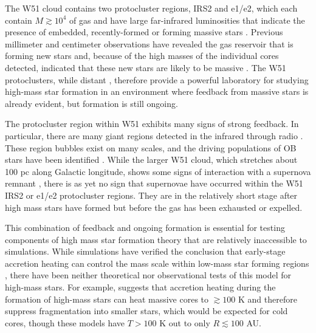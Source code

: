 \documentclass{emulateapj}
\begin{document}
The W51 cloud contains two protocluster regions, IRS2 and e1/e2, which each
contain $M\gtrsim10^4$ \msun of gas and have large far-infrared luminosities
that
indicate the presence of embedded, recently-formed or forming massive stars
\citep{Harvey1986a,Sievers1991a,Ginsburg2012a,Ginsburg2016b}.  Previous
millimeter and centimeter observations have revealed the gas reservoir
that is forming new stars and, because of the high masses of the individual
cores detected, indicated that these new stars are likely to be massive
\citep{Zhang1997a,Eisner2002a,Zapata2009a,Tang2009a,
Zapata2010a,Shi2010b,Shi2010a,Koch2010a,Koch2012a,Koch2012b,Tang2013b,Goddi2016a}.  The
W51 protoclusters, while distant \citep[5.4 kpc;][]{Sato2010a}, therefore
provide a powerful laboratory for studying high-mass star formation in an
environment where feedback from massive stars is already evident, but 
formation is still ongoing.

The protocluster region within W51 exhibits many signs of strong feedback.  In
particular, there are many giant \hii regions detected in the infrared through
radio \citep{Mehringer1994a,Ginsburg2015a}.  These \hii region bubbles exist
on many scales, and the driving populations of OB stars have been identified
\citep{Kumar2004a,Ginsburg2016a}.  While the larger W51 cloud, which stretches
about 100 pc along Galactic longitude, shows some signs of interaction with a
supernova remnant \citep{Brogan2013a,Ginsburg2015a}, there is as yet no
sign that supernovae have occurred within the W51 IRS2 or e1/e2 protocluster
regions.  They are in the relatively short stage after  high mass stars
have formed but before the gas has been exhausted or expelled.

This combination of feedback and ongoing formation is essential for testing
components of high mass star formation theory that are relatively inaccessible
to simulations.  While simulations have verified the conclusion that
early-stage accretion heating can control the mass scale within low-mass star
forming regions \citep{Krumholz2007c, Offner2011b, Bate2012a,Bate2014b,
Guszejnov2015c, Guszejnov2016a,Krumholz2016a}, there
have been neither theoretical nor observational tests of this model for
high-mass stars.   For example, \citet{Krumholz2006a} suggests that accretion
heating during the formation of high-mass stars can heat massive cores to
$\gtrsim100$ K and therefore suppress fragmentation into smaller stars, which
would be expected for cold cores, though these models have $T>100$ K out to
only $R\lesssim100$ AU.  
\end{document}
